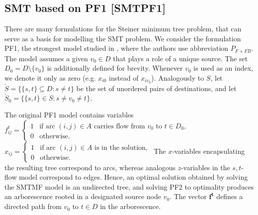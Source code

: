 \subsection{SMT based on PF1 [SMTPF1]}

There are many formulations for the Steiner minimum tree problem, that can serve as a basis for modelling the SMT problem. We consider the formulation PF1, the strongest model studied in \cite{Polzin}, where the authors use abbreviation $P_{F+FB}$. The model assumes a given $v_0\in D$ that plays a role of a unique source. The set $D_0 = D\setminus \{v_0\}$ is additionally defined for brevity. Whenever $v_0$ is used as an index, we denote it only as zero (e.g. $x_{i0}$ instead of $x_{i{v_0}}$). Analogously to $S$, let $\check{S}=\{\{s,t\}\subseteq D: s\neq t\}$ be the set of unordered pairs of destinations, and let $\check{S}_0=\{\{s,t\}\in S: s\neq v_0\neq t\}$.

The original PF1 model contains variables
\newline\newline  
  $f^{t}_{ij}=
	\begin{cases}
    1 & \text{if arc $(i,j) \in A$ carries flow from $v_0$ to $t\in D_0$},\\
    0 & \text{otherwise}.
  \end{cases}$  
\newline\newline  
  $x_{ij}=
	\begin{cases}
    1 & \text{if arc $(i,j) \in A$ is in the solution},\\
    0 & \text{otherwise}.
  \end{cases}$  
\newline
\newline   
The $x$-variables encapsulating the resulting tree correspond to arcs, whereas analogous $z$-variables in the $s,t$-flow model correspond to edges. Hence, an optimal solution obtained by solving the SMTMF model is an undirected tree, and solving PF2 to optimality produces an arborescence rooted in a designated source node $v_0$. The vector $\mathbf{f^t}$ defines a directed path from $v_0$ to $t\in D$ in the arborescence.

